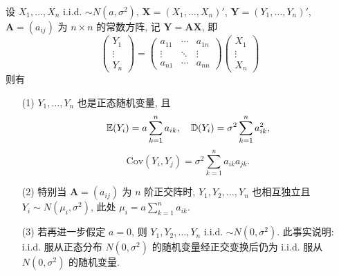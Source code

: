 \begin{theorem}[独立同分布正态变量线性变换的性质] \label{thm:linear_transformation_of_normals}
设 $X_1, \ldots, X_n$ i.i.d. $\sim N(a,\sigma^2)$, $\boldsymbol{X} = (X_1, \ldots, X_n)'$, $\boldsymbol{Y} = (Y_1, \ldots, Y_n)'$, $\boldsymbol{A} = (a_{ij})$ 为 $n \times n$ 的常数方阵, 记 $\boldsymbol{Y} = \boldsymbol{A}\boldsymbol{X}$, 即
\begin{equation} \label{eq:matrix_transformation}
\begin{pmatrix} Y_1 \\ \vdots \\ Y_n \end{pmatrix} = \begin{pmatrix} a_{11} & \cdots & a_{1n} \\ \vdots & \ddots & \vdots \\ a_{n1} & \cdots & a_{nn} \end{pmatrix} \begin{pmatrix} X_1 \\ \vdots \\ X_n \end{pmatrix}
\end{equation}
则有
\begin{itemize}
    \item [(1)] $Y_1, \ldots, Y_n$ 也是正态随机变量, 且
\[
\mathbb{E}(Y_i) = a \sum_{k=1}^n a_{ik}, \quad \mathbb{D}(Y_i) = \sigma^2 \sum_{k=1}^n a_{ik}^2,
\]
\[
\text{Cov}(Y_i, Y_j) = \sigma^2 \sum_{k=1}^n a_{ik}a_{jk}.
\]
    \item [(2)] 特别当 $\boldsymbol{A} = (a_{ij})$ 为 $n$ 阶正交阵时, $Y_1, Y_2, \ldots, Y_n$ 也相互独立且 $Y_i \sim N(\mu_i, \sigma^2)$, 此处 $\mu_i = a \sum_{k=1}^n a_{ik}$.

    \item [(3)] 若再进一步假定 $a=0$, 则 $Y_1, Y_2, \ldots, Y_n$ i.i.d. $\sim N(0, \sigma^2)$. 此事实说明: i.i.d. 服从正态分布 $N(0, \sigma^2)$ 的随机变量经正交变换后仍为 i.i.d. 服从 $N(0, \sigma^2)$ 的随机变量.
\end{itemize}
\end{theorem}

